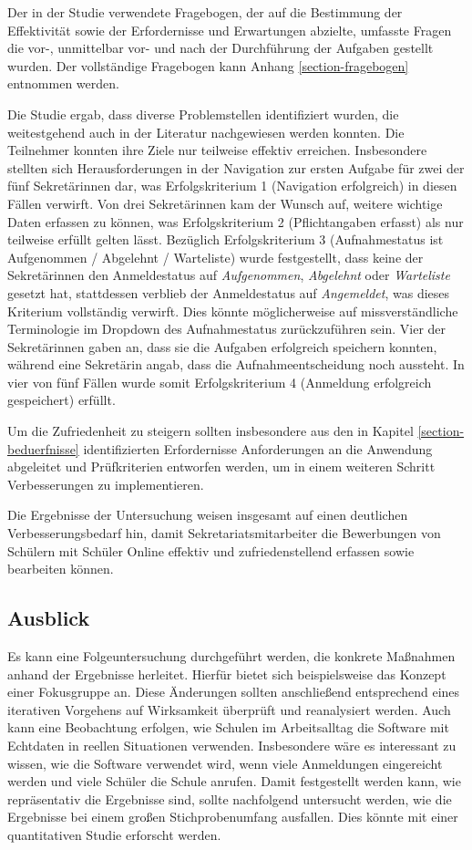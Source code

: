 Der in der Studie verwendete Fragebogen, der auf die Bestimmung der Effektivität sowie der Erfordernisse und Erwartungen abzielte, umfasste Fragen die vor-, unmittelbar vor- und nach der Durchführung der Aufgaben gestellt wurden. Der vollständige Fragebogen kann Anhang \ref{section-fragebogen} entnommen werden.

Die Studie ergab, dass diverse Problemstellen identifiziert wurden, die weitestgehend auch in der Literatur nachgewiesen werden konnten. Die Teilnehmer konnten ihre Ziele nur teilweise effektiv erreichen. Insbesondere stellten sich Herausforderungen in der Navigation zur ersten Aufgabe für zwei der fünf Sekretärinnen dar, was Erfolgskriterium 1 (Navigation erfolgreich) in diesen Fällen verwirft. Von drei Sekretärinnen kam der Wunsch auf, weitere wichtige Daten erfassen zu können, was Erfolgskriterium 2 (Pflichtangaben erfasst) als nur teilweise erfüllt gelten lässt. Bezüglich Erfolgskriterium 3 (Aufnahmestatus ist Aufgenommen / Abgelehnt / Warteliste) wurde festgestellt, dass keine der Sekretärinnen den Anmeldestatus auf \textit{Aufgenommen}, \textit{Abgelehnt} oder \textit{Warteliste} gesetzt hat, stattdessen verblieb der Anmeldestatus auf \textit{Angemeldet}, was dieses Kriterium vollständig verwirft. Dies könnte möglicherweise auf missverständliche Terminologie im Dropdown des Aufnahmestatus zurückzuführen sein. 
Vier der Sekretärinnen gaben an, dass sie die Aufgaben erfolgreich speichern konnten, während eine Sekretärin angab, dass die Aufnahmeentscheidung noch aussteht. In vier von fünf Fällen wurde somit Erfolgskriterium 4 (Anmeldung erfolgreich gespeichert) erfüllt.

Um die Zufriedenheit zu steigern sollten insbesondere aus den in Kapitel \ref{section-beduerfnisse} identifizierten Erfordernisse Anforderungen an die Anwendung abgeleitet und Prüfkriterien entworfen werden, um in einem weiteren Schritt Verbesserungen zu implementieren.   

Die Ergebnisse der Untersuchung weisen insgesamt auf einen deutlichen Verbesserungsbedarf hin, damit Sekretariatsmitarbeiter die Bewerbungen von Schülern mit Schüler Online effektiv und zufriedenstellend erfassen sowie bearbeiten können.

\subsection{Ausblick}
Es kann eine Folgeuntersuchung durchgeführt werden, die konkrete Maßnahmen anhand der Ergebnisse herleitet. Hierfür bietet sich beispielsweise das Konzept einer Fokusgruppe an. Diese Änderungen sollten anschließend entsprechend eines iterativen Vorgehens auf Wirksamkeit überprüft und reanalysiert werden. 
Auch kann eine Beobachtung erfolgen, wie Schulen im Arbeitsalltag die Software mit Echtdaten in reellen Situationen verwenden. Insbesondere wäre es interessant zu wissen, wie die Software verwendet wird, wenn viele Anmeldungen eingereicht werden und viele Schüler die Schule anrufen.
Damit festgestellt werden kann, wie repräsentativ die Ergebnisse sind, sollte nachfolgend untersucht werden, wie die Ergebnisse bei einem großen Stichprobenumfang ausfallen. Dies könnte mit einer quantitativen Studie erforscht werden.
